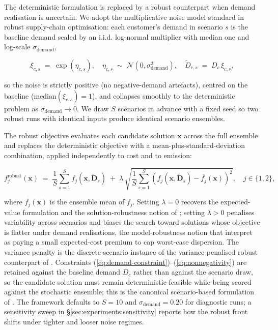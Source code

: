 \documentclass[review,preprint,authoryear,12pt]{elsarticle}
\begin{document}
The deterministic formulation is replaced by a robust counterpart
when demand realisation is uncertain. We adopt the multiplicative
noise model standard in robust supply-chain optimisation: each
customer's demand in scenario $s$ is the baseline demand scaled by
an i.i.d. log-normal multiplier with median one and log-scale
$\sigma_{\mathrm{demand}}$,

\begin{equation}
\xi_{c,s} \;=\; \exp(\eta_{c,s}),
\quad \eta_{c,s} \;\sim\; \mathcal{N}(0, \sigma_{\mathrm{demand}}^2),
\quad
\widetilde{D}_{c,s} \;=\; D_c \, \xi_{c,s},
\label{eq:lognormal-noise}
\end{equation}

so the noise is strictly positive (no negative-demand artefacts),
centred on the baseline ($\mathrm{median}(\xi_{c,s}) = 1$), and
collapses smoothly to the deterministic problem as
$\sigma_{\mathrm{demand}} \to 0$. We draw $S$ scenarios in advance
with a fixed seed so two robust runs with identical inputs produce
identical scenario ensembles.

The robust objective evaluates each candidate solution $\mathbf{x}$
across the full ensemble and replaces the deterministic objective
with a mean-plus-standard-deviation combination, applied
independently to cost and to emission:

\begin{equation}
f^{\mathrm{robust}}_j(\mathbf{x})
\;=\;
\frac{1}{S} \sum_{s=1}^{S} f_j(\mathbf{x}, \widetilde{\mathbf{D}}_s)
\;+\;
\lambda \,
\sqrt{ \frac{1}{S} \sum_{s=1}^{S} \!
\left( f_j(\mathbf{x}, \widetilde{\mathbf{D}}_s)
       - \overline{f_j}(\mathbf{x}) \right)^{2} },
\quad j \in \{1, 2\},
\label{eq:robust-objective}
\end{equation}

where $\overline{f_j}(\mathbf{x})$ is the ensemble mean of $f_j$.
Setting $\lambda = 0$ recovers the expected-value formulation and
the solution-robustness notion of \citet[\S2]{mulveyvz1995robust};
setting $\lambda > 0$ penalises variability across scenarios and
biases the search toward solutions whose objective is flatter under
demand realisations, the model-robustness notion that
\citet[\S3]{bertsimassim2004price} interpret as paying a small
expected-cost premium to cap worst-case dispersion. The variance
penalty is the discrete-scenario instance of the variance-penalised
robust counterpart of \citet[\S2]{bentalnemirovski2002robust}.
Constraints (\ref{eq:demand-constraint})--(\ref{eq:nonnegativity})
are retained against the baseline demand $D_c$ rather than against
the scenario draw, so the candidate solution must remain
deterministic-feasible while being scored against the stochastic
ensemble; this is the canonical scenario-based formulation of
\citet[\S2]{mulveyvz1995robust}. The framework defaults to $S = 10$
and $\sigma_{\mathrm{demand}} = 0.20$ for diagnostic runs; a
sensitivity sweep in \S\ref{sec:experiments:sensitivity} reports how
the robust front shifts under tighter and looser noise regimes.
\end{document}
